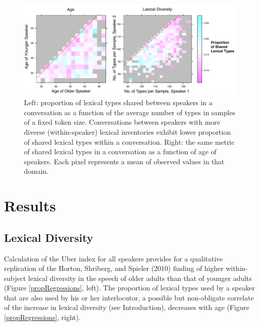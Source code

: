 \documentclass[10pt,letterpaper]{article}
\begin{document}
\begin{figure}[t]
\centering
\includegraphics[width=6in]{figures/jaccardsTypesAges.pdf}
\caption{Left: proportion of lexical types shared between speakers in a conversation as a function of the average number of types in samples of a fixed token size. Conversations between speakers with more diverse (within-speaker) lexical inventories exhibit lower proportion of shared lexical types within a conversation. Right:  the same metric of shared lexical types in a conversation as a function of age of speakers. Each pixel represents a mean of observed values in that domain.} 
\label{jaccardTypesAge}
\end{figure}

\section{Results}
\subsection{Lexical Diversity}
Calculation of the Uber index for all speakers provides for a qualitative replication of the Horton, Shriberg, and Spieler (2010) finding of higher within-subject lexical diversity in the speech of older adults than that of younger adults (Figure \ref{propRegressions}, left). The proportion of lexical types used by a speaker that are also used by his or her interlocutor, a possible but non-obligate correlate of the increase in lexical diversity (see Introduction), decreases with age (Figure \ref{propRegressions}, right). 
\end{document}
